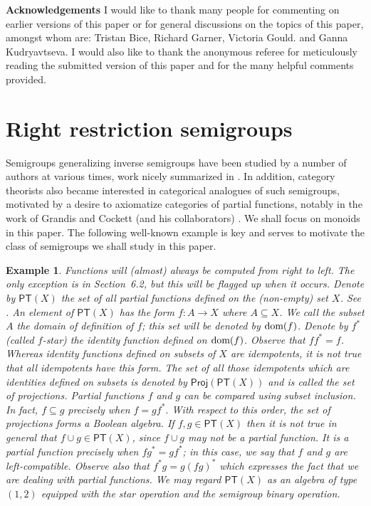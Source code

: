 \documentclass[a4paper]{amsart}
\newtheorem{example}[theorem]{Example}
\begin{document}
\noindent
{\bf Acknowledgements } 
I would like to thank many people for commenting on earlier versions of this paper or for general discussions on the topics of this paper,
amongst whom are:
Tristan Bice, 
Richard Garner,
Victoria Gould.
and 
Ganna Kudryavtseva.
I would also like to thank the anonymous referee for meticulously reading the submitted version of this paper
and for the many helpful comments provided.\\





\section{Right restriction semigroups}


Semigroups generalizing inverse semigroups have been studied by a number of authors at various times, work nicely summarized in \cite{Hollings}.
In addition, category theorists also became interested in categorical analogues of such semigroups,
motivated by a desire to axiomatize categories of partial functions,
notably in the work of Grandis \cite{Grandis} and Cockett (and his collaborators) \cite{Cockett}.
We shall focus on monoids in this paper.
The following well-known example is key and serves to motivate the class of semigroups we shall study in this paper.

\begin{example}\label{ex:first}
{\em Functions will (almost) always be computed from right to left.
The only exception is in Section~6.2, but this will be flagged up when it occurs.
Denote by  $\mathsf{PT}(X)$ the set of all partial functions defined on the (non-empty) set $X$.
See \cite{Gould}.
An element of  $\mathsf{PT}(X)$ has the form $f \colon A \rightarrow X$ where $A \subseteq X$.  
We call the subset $A$ the {\em domain of definition} of $f$;
this set will be denoted by $\mbox{\rm dom}(f)$. 
Denote by $f^{\ast}$ (called {\em $f$-star}) the identity function defined on $\mbox{\rm dom}(f)$. 
Observe that $ff^{\ast} = f$.
Whereas identity functions defined on subsets of $X$ are idempotents,
it is not true that all idempotents have this form.
The set of all those idempotents which are identities defined on subsets is denoted by $\mathsf{Proj}(\mathsf{PT}(X))$
and is called the set of {\em projections}.
Partial functions $f$ and $g$ can be compared using subset inclusion.
In fact, $f \subseteq g$ precisely when $f = gf^{\ast}$.
With respect to this order, the set of projections forms a Boolean algebra.
If $f,g \in \mathsf{PT}(X)$ then it is not true in general that $f \cup g \in \mathsf{PT}(X)$, since $f \cup g$ 
may not be a partial function.
It is a partial function precisely when $fg^{\ast} = gf^{\ast}$;
in this case, we say that $f$ and $g$ are {\em left-compatible}.
Observe also that $f^{\ast}g = g(fg)^{\ast}$ which expresses the fact that we are dealing with partial {\em functions}.
We may regard $\mathsf{PT}(X)$ as an algebra of type $(1,2)$ equipped with the star operation and the semigroup binary operation.
}
\end{example}
 
\end{document}
